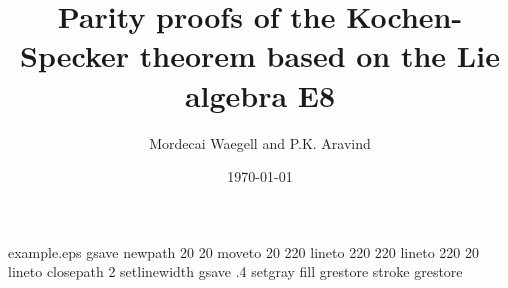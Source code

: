 %
%
%
%
%
\begin{filecontents*}{example.eps}
gsave
newpath
  20 20 moveto
  20 220 lineto
  220 220 lineto
  220 20 lineto
closepath
2 setlinewidth
gsave
  .4 setgray fill
grestore
stroke
grestore
\end{filecontents*}
%
\RequirePackage{fix-cm}
%
\documentclass[smallextended]{svjour3}       %
%
\smartqed  %
%
\usepackage{graphicx}
\usepackage{multirow}
\usepackage{epsfig}

%
%
%
\newcommand{\degree}{\ensuremath{^\circ}}
%
\journalname{}

\title{Parity proofs of the Kochen-Specker theorem based on the Lie algebra E8}

\author{Mordecai Waegell and P.K. Aravind }



\date{\today}


